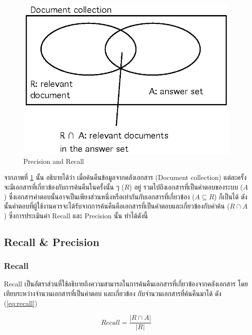 \documentclass[11pt,a4paper]{article}
\begin{document}
{{{\begin{figure}[ht!]
    \centering
    \includegraphics{precision-and-recall.eps}
    \caption{Precision and Recall}
    \label{fig:precisionandrecall}
\end{figure}

จากภาพที่ \ref{fig:precisionandrecall} นั้น อธิบายได้ว่า เมื่อค้นคืนข้อมูลจากคลังเอกสาร (Document collection) แต่ละครั้ง 
จะมีเอกสารที่เกี่ยวข้องกับการค้นคืนในครั้งนั้น ๆ ($R$) อยู่ รวมไปถึงเอกสารที่เป็นคำตอบของระบบ ($A$)
ซึ่งเอกสารคำตอบนั้นอาจเป็นเพียงส่วนหนึ่งหรือเท่ากันกับเอกสารที่เกี่ยวข้อง ($A \subseteq R$) ก็เป็นได้ 
ดังนั้นคำตอบที่ผู้ใช้งานควรจะได้รับจากการค้นคืนคือเอกสารที่เป็นคำตอบและเกี่ยวข้องกับคำค้น ($R \cap A$) ซึ่งการประเมินค่า Recall 
และ Precision นั้น ทำได้ดังนี้

\subsection{Recall \& Precision}

\subsubsection{Recall}

Recall เป็นอัตราส่วนที่ใช้อธิบายถึงความสามารถในการค้นคืนเอกสารที่เกี่ยวข้องจากคลังเอกสาร โดยเทียบระหว่างจำนวนเอกสารที่เป็นคำตอบ
และเกี่ยวข้อง กับจำนวนเอกสารที่ค้นคืนมาได้ ดัง (\ref{eq:recall})

\begin{equation}
    Recall = \frac{|R \cap A|}{|R|}
    \label{eq:recall}
\end{equation}

}}}
\end{document}
